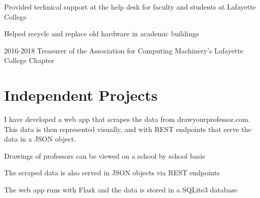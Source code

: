 \documentclass[letterpaper]{deedy-resume} %
\begin{document}
\begin{minipage}[t]{0.64\textwidth}
\sectionspace %





\begin{tightitemize}
\item Provided technical support at the help desk for faculty and students at Lafayette College
\item Helped recycle and replace old hardware in academic buildings
\end{tightitemize}

\sectionspace

\begin{tightitemize}
\item 2016-2018 Treasurer of the Association for Computing Machinery's 
Lafayette College Chapter \\
\end{tightitemize}

\sectionspace



\section{Independent Projects}

I have developed a web app that scrapes the data from drawyourprofessor.com. This data is then represented visually, and with REST endpoints that serve the data in a JSON object.
\begin{tightitemize}
\item Drawings of professors can be viewed on a school by school basis
\item The scraped data is also served in JSON objects via REST endpoints
\item The web app runs with Flask and the data is stored in a SQLite3 database
\end{tightitemize}




\end{minipage}
\end{document}
